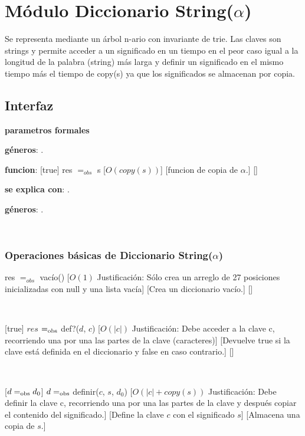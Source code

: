 \section{Módulo Diccionario String($\alpha$)}

Se representa mediante un árbol n-ario con invariante de trie. Las claves son strings y permite acceder a un significado en un tiempo en el peor caso igual a la longitud de la palabra (string) más larga y definir un significado en el mismo tiempo más el tiempo
de copy(s) ya que los significados se almacenan por copia.

\subsection{Interfaz}

\textbf{parametros formales}

\textbf{géneros}: \TipoVariable{$\alpha$}.

\textbf{funcion}: 
				  [true]
				  {res $=_{obs}$ s}
				  [$O(copy(s))$]
				  [funcion de copia de $\alpha$.]
				  []

\textbf{se explica con}: .

\textbf{géneros}: .



~

\subsubsection{Operaciones básicas de Diccionario String($\alpha$)}

{res $=_{obs}$ vacío()}
[$O(1)$ Justificación: Sólo crea un arreglo de 27 posiciones inicializadas con null y una lista vacía]
[Crea un diccionario vacío.]
[]

~



[true]
{$res$ $=_{\mathrm{obs}}$ def?($d$, $c$)}
[$O(|c|)$ Justificación: Debe acceder a la clave c, recorriendo una por una las partes de la clave (caracteres)]
[Devuelve true si la clave está definida en el diccionario y false en caso contrario.]
[]

~

[$ d =_{\mathrm{obs}} d_0 $]
{$ d =_{\mathrm{obs}}$ definir($c$, $s$, $d_0$)}
[$O(|c| + copy(s))$ Justificación: Debe definir la clave c, recorriendo una por una las partes de la clave y después copiar el contenido del significado.]
[Define la clave $c$ con el significado $s$]
[Almacena una copia de $s$.]

